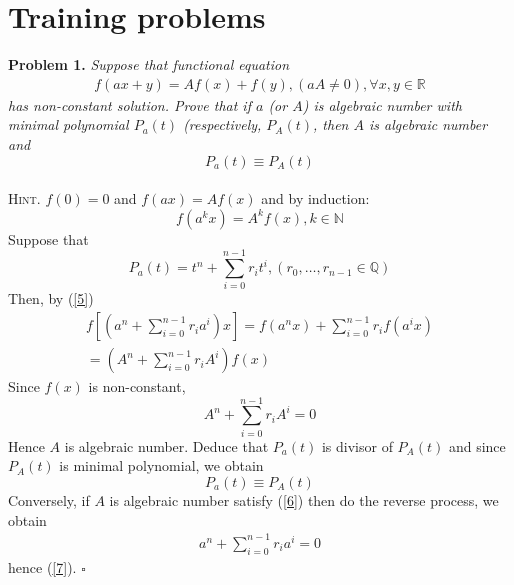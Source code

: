 \documentclass{article}
\numberwithin{equation}{section}
\begin{document}
\section{Training problems}
\textbf{Problem 1.} \textit{Suppose that functional equation
\begin{align}
f\left( {ax + y} \right) = Af\left( x \right) + f\left( y \right),\left( {aA \ne 0} \right),\forall x,y \in \mathbb{R}
\end{align}
has non-constant solution. Prove that if $a$ (or $A$) is algebraic number with minimal polynomial $P_a(t)$ (respectively, $P_A(t)$, then $A$ is algebraic number and
\begin{equation}
\label{7}
{P_a}\left( t \right) \equiv {P_A}\left( t \right)
\end{equation}
}\\
\textsc{Hint.} $f(0)=0$ and $f(ax)=Af(x)$ and by induction:
\begin{equation}
\label{5}
f\left( {{a^k}x} \right) = {A^k}f\left( x \right),k \in \mathbb{N}
\end{equation}
Suppose that
\begin{equation}
{P_a}\left( t \right) = {t^n} + \sum\limits_{i = 0}^{n - 1} {{r_i}{t^i},\left( {{r_0}, \ldots ,{r_{n - 1}} \in \mathbb{Q}} \right)} 
\end{equation}
Then, by (\ref{5})
\begin{align}
f\left[ {\left( {{a^n} + \sum\limits_{i = 0}^{n - 1} {{r_i}{a^i}} } \right)x} \right] = f\left( {{a^n}x} \right) + \sum\limits_{i = 0}^{n - 1} {{r_i}f\left( {{a^i}x} \right)} \\
 = \left( {{A^n} + \sum\limits_{i = 0}^{n - 1} {{r_i}{A^i}} } \right)f\left( x \right)
\end{align}
Since $f(x)$ is non-constant, 
\begin{equation}
\label{6}
{A^n} + \sum\limits_{i = 0}^{n - 1} {{r_i}{A^i}}  = 0
\end{equation}
Hence $A$ is algebraic number. Deduce that $P_a(t)$ is divisor of $P_A(t)$ and since $P_A(t)$ is minimal polynomial, we obtain
\begin{equation}
{P_a}\left( t \right) \equiv {P_A}\left( t \right)
\end{equation}
Conversely, if $A$ is algebraic number satisfy (\ref{6}) then do the reverse process, we obtain
\begin{align}
{a^n} + \sum\limits_{i = 0}^{n - 1} {{r_i}{a^i}}  = 0
\end{align}
hence (\ref{7}). \hfill $\square$\\
\end{document}
